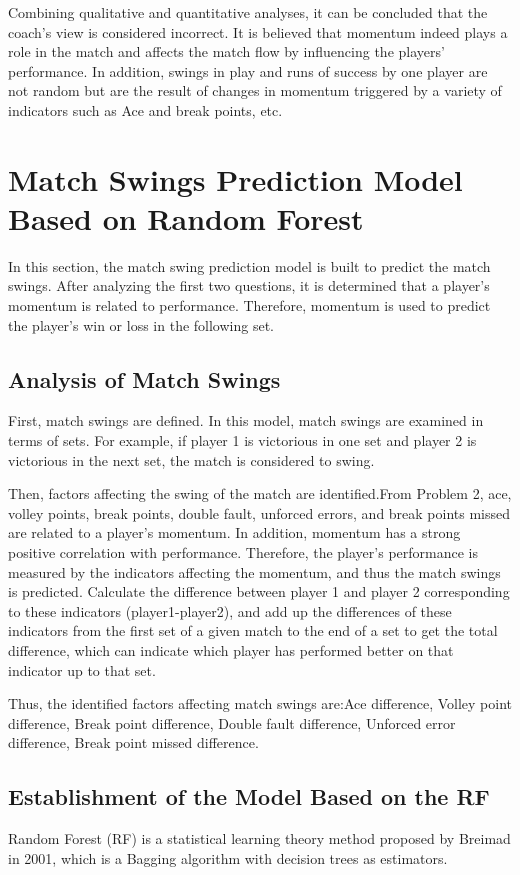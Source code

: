 \documentclass[12pt]{article}  %
\begin{document}
Combining qualitative and quantitative analyses, it can be concluded that the coach's view is considered incorrect. It is believed that momentum indeed plays a role in the match and affects the match flow by influencing the players' performance. In addition, swings in play and runs of success by one player are not random but are the result of changes in momentum triggered by a variety of indicators such as Ace and break points, etc.

\section{Match Swings Prediction Model Based on Random Forest}
In this section, the match swing prediction model is built to predict the match swings. After analyzing the first two questions, it is determined that a player's momentum is related to performance. Therefore, momentum is used to predict the player's win or loss in the following set.

\subsection{Analysis of Match Swings}
First, match swings are defined. In this model, match swings are examined in terms of sets. For example, if player 1 is victorious in one set and player 2 is victorious in the next set, the match is considered to swing.

Then, factors affecting the swing of the match are identified.From Problem 2, ace, volley points, break points, double fault, unforced errors, and break points missed are related to a player's momentum. In addition, momentum has a strong positive correlation with performance. Therefore, the player's performance is measured by the indicators affecting the momentum, and thus the  match swings is predicted. Calculate the difference between player 1 and player 2 corresponding to these indicators (player1-player2), and add up the differences of these indicators from the first set of a given match to the end of a set to get the total difference, which can indicate which player has performed better on that indicator up to that set.

Thus, the identified factors affecting match swings are:Ace difference, Volley point difference, Break point difference, Double fault difference, Unforced error difference, Break point missed difference.

\subsection{Establishment of the Model Based on the RF}
Random Forest (RF) is a statistical learning theory method proposed by Breimad in 2001\cite{11}, which is a Bagging algorithm with decision trees as estimators. 
\end{document}
